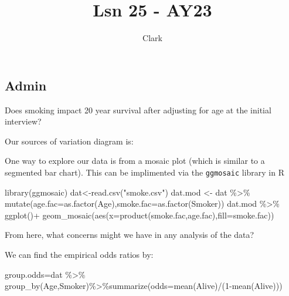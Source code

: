 \documentclass[
]{article}
\title{Lsn 25 - AY23}
\author{Clark}
\date{}
\newenvironment{Shaded}{\begin{snugshade}}{\end{snugshade}}
\newcommand{\AttributeTok}[1]{\textcolor[rgb]{0.77,0.63,0.00}{#1}}
\newcommand{\DecValTok}[1]{\textcolor[rgb]{0.00,0.00,0.81}{#1}}
\newcommand{\FunctionTok}[1]{\textcolor[rgb]{0.00,0.00,0.00}{#1}}
\newcommand{\NormalTok}[1]{#1}
\newcommand{\OtherTok}[1]{\textcolor[rgb]{0.56,0.35,0.01}{#1}}
\newcommand{\SpecialCharTok}[1]{\textcolor[rgb]{0.00,0.00,0.00}{#1}}
\newcommand{\StringTok}[1]{\textcolor[rgb]{0.31,0.60,0.02}{#1}}
\begin{document}
\maketitle

\hypertarget{admin}{%
\subsection{Admin}\label{admin}}

Does smoking impact 20 year survival after adjusting for age at the
initial interview?

Our sources of variation diagram is:

\vspace{1.in}

One way to explore our data is from a mosaic plot (which is similar to a
segmented bar chart). This can be implimented via the \texttt{ggmosaic}
library in R

\begin{Shaded}
\begin{Highlighting}[]
\FunctionTok{library}\NormalTok{(ggmosaic)}
\NormalTok{dat}\OtherTok{\textless{}{-}}\FunctionTok{read.csv}\NormalTok{(}\StringTok{"smoke.csv"}\NormalTok{)}
\NormalTok{dat.mod }\OtherTok{\textless{}{-}}\NormalTok{ dat }\SpecialCharTok{\%\textgreater{}\%} \FunctionTok{mutate}\NormalTok{(}\AttributeTok{age.fac=}\FunctionTok{as.factor}\NormalTok{(Age),}\AttributeTok{smoke.fac=}\FunctionTok{as.factor}\NormalTok{(Smoker))}
\NormalTok{dat.mod }\SpecialCharTok{\%\textgreater{}\%} \FunctionTok{ggplot}\NormalTok{()}\SpecialCharTok{+}
  \FunctionTok{geom\_mosaic}\NormalTok{(}\FunctionTok{aes}\NormalTok{(}\AttributeTok{x=}\FunctionTok{product}\NormalTok{(smoke.fac,age.fac),}\AttributeTok{fill=}\NormalTok{smoke.fac))}
\end{Highlighting}
\end{Shaded}

From here, what concerns might we have in any analysis of the data?

\vspace{1.in}

We can find the empirical odds ratios by:

\begin{Shaded}
\begin{Highlighting}[]
\NormalTok{group.odds}\OtherTok{=}\NormalTok{dat }\SpecialCharTok{\%\textgreater{}\%} \FunctionTok{group\_by}\NormalTok{(Age,Smoker)}\SpecialCharTok{\%\textgreater{}\%}\FunctionTok{summarize}\NormalTok{(}\AttributeTok{odds=}\FunctionTok{mean}\NormalTok{(Alive)}\SpecialCharTok{/}\NormalTok{(}\DecValTok{1}\SpecialCharTok{{-}}\FunctionTok{mean}\NormalTok{(Alive)))}
\end{Highlighting}
\end{Shaded}
\end{document}
